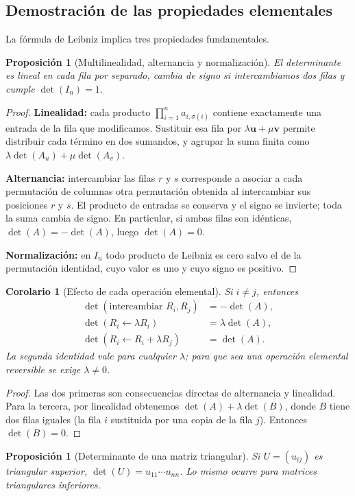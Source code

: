 \documentclass[12pt]{article}
\newtheorem{proposicion}[definicion]{Proposición}
\newtheorem{corolario}[definicion]{Corolario}
\theoremstyle{remark}
\newcommand{\vect}[1]{\boldsymbol{#1}}
\begin{document}
\subsection{Demostración de las propiedades elementales}
La fórmula de Leibniz implica tres propiedades fundamentales.
\begin{proposicion}[Multilinealidad, alternancia y normalización]
El determinante es lineal en cada fila por separado, cambia de signo si intercambiamos dos filas y cumple $\det(I_n)=1$.
\end{proposicion}
\begin{proof}
\textbf{Linealidad:} cada producto $\prod_{i=1}^na_{i,\sigma(i)}$ contiene exactamente una entrada de la fila que modificamos. Sustituir esa fila por $\lambda\vect u+\mu\vect v$ permite distribuir cada término en dos sumandos, y agrupar la suma finita como $\lambda\det(A_u)+\mu\det(A_v)$.

\textbf{Alternancia:} intercambiar las filas $r$ y $s$ corresponde a asociar a cada permutación de columnas otra permutación obtenida al intercambiar sus posiciones $r$ y $s$. El producto de entradas se conserva y el signo se invierte; toda la suma cambia de signo. En particular, si ambas filas son idénticas, $\det(A)=-\det(A)$, luego $\det(A)=0$.

\textbf{Normalización:} en $I_n$ todo producto de Leibniz es cero salvo el de la permutación identidad, cuyo valor es uno y cuyo signo es positivo.
\end{proof}
\begin{corolario}[Efecto de cada operación elemental]
Si $i\ne j$, entonces
\begin{align*}
\det(\text{intercambiar }R_i,R_j)&=-\det(A),\\
\det(R_i\leftarrow\lambda R_i)&=\lambda\det(A),\\
\det(R_i\leftarrow R_i+\lambda R_j)&=\det(A).
\end{align*}
La segunda identidad vale para cualquier $\lambda$; para que sea una operación elemental reversible se exige $\lambda\ne0$.
\end{corolario}
\begin{proof}
Las dos primeras son consecuencias directas de alternancia y linealidad. Para la tercera, por linealidad obtenemos $\det(A)+\lambda\det(B)$, donde $B$ tiene dos filas iguales (la fila $i$ sustituida por una copia de la fila $j$). Entonces $\det(B)=0$.
\end{proof}
\begin{proposicion}[Determinante de una matriz triangular]
Si $U=(u_{ij})$ es triangular superior, $\det(U)=u_{11}\cdots u_{nn}$. Lo mismo ocurre para matrices triangulares inferiores.
\end{proposicion}
\end{document}
